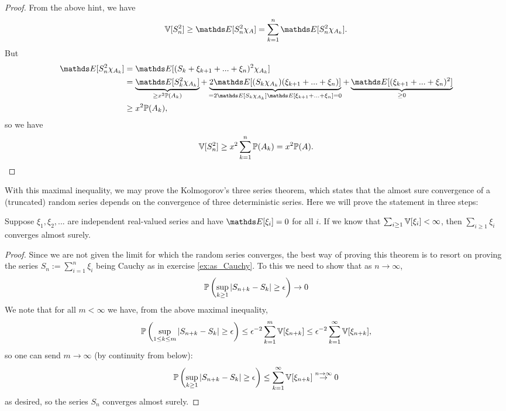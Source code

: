 \begin{proof}
From the above hint, we have
\begin{equation*}
    \V[S_n^2] \geq \E[S_n^2 \chi_A] = \sum_{k=1}^n \E[S_n^2 \chi_{A_k}].
\end{equation*}
But 
\begin{align*}
    \E[S_n^2 \chi_{A_k}] &= \E[(S_k + \xi_{k+1} + ... + \xi_n)^2 \chi_{A_k}] \\
    &= \underbrace{\E[S_k^2 \chi_{A_k}]}_{\geq x^2 \p(A_k)} + \underbrace{2\E[(S_k \chi_{A_k})(\xi_{k+1} + ... + \xi_n)]}_{= 2\E[S_k \chi_{A_k}] \E[\xi_{k+1} + ... + \xi_n] = 0} + \underbrace{\E[(\xi_{k+1} + ... + \xi_n)^2]}_{\geq 0} \\
    &\geq x^2 \p(A_k),
\end{align*}
so we have
\begin{equation}
    \mathbb{V}[S_n^2] \geq x^2 \sum_{k=1}^n \mathbb{P}(A_k) = x^2 \mathbb{P}(A).
\end{equation}
\end{proof}

With this maximal inequality, we may prove the Kolmogorov's three series theorem, which states that the almost sure convergence of a (truncated) random series depends on the convergence of three deterministic series. Here we will prove the statement in three steps:

\begin{lemma}
Suppose $\xi_1, \xi_2, ...$ are independent real-valued series and have $\E[\xi_i] = 0$ for all $i$. If we know that $\sum_{i\geq 1} \mathbb{V}[\xi_i] < \infty$, then $\sum_{i\geq 1} \xi_i$ converges almost surely.
\end{lemma}

\begin{proof}
Since we are not given the limit for which the random series converges, the best way of proving this theorem is to resort on proving the series $S_n := \sum_{i=1}^n \xi_i$ being Cauchy as in exercise \ref{ex:as_Cauchy}. To this we need to show that as $n \to \infty$,
\begin{equation*}
    \mathbb{P}\left( \sup_{k\geq 1} |S_{n+k} - S_k| \geq \epsilon \right) \to 0
\end{equation*}
We note that for all $m < \infty$ we have, from the above maximal inequality,
\begin{equation}
    \mathbb{P}\left( \sup_{1 \leq k \leq m} |S_{n+k} - S_k| \geq \epsilon \right) \leq \epsilon^{-2} \sum_{k=1}^m \mathbb{V}[\xi_{n+k}] \leq \epsilon^{-2} \sum_{k=1}^\infty \mathbb{V}[\xi_{n+k}],
\end{equation}
so one can send $m \to \infty$ (by continuity from below):
\begin{equation}
\mathbb{P}\left( \sup_{k \geq 1} |S_{n+k} - S_k| \geq \epsilon \right) \leq \sum_{k=1}^\infty \mathbb{V}[\xi_{n+k}] \overset{n \to \infty}{\to} 0
\end{equation}
as desired, so the series $S_n$ converges almost surely.
\end{proof}

